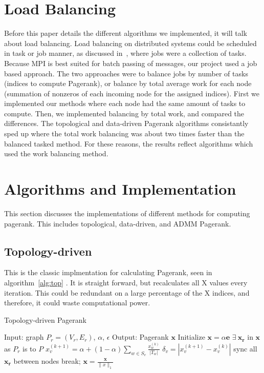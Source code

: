 \documentclass[letterpaper,12pt,onecolumn]{article}
\begin{document}
\section{Load Balancing}
Before this paper details the different algorithms we implemented, it will talk about load balancing. Load balancing on distributed systems could be scheduled in task or job manner, as discussed in~\cite{distributed}, where jobs were a collection of tasks. Because MPI is best suited for batch passing of messages, our project used a job based approach. The two approaches were to balance jobs by number of tasks (indices to compute Pagerank), or balance by total average work for each node (summation of nonzeros of each incoming node for the assigned indices). First we implemented our methods where each node had the same amount of tasks to compute. Then, we implemented balancing by total work, and compared the differences. The topological and data-driven Pagerank algorithms consistantly sped up where the total work balancing was about two times faster than the balanced tasked method. For these reasons, the results reflect algorithms which used the work balancing method. 

\section{Algorithms and Implementation}

This section discusses the implementations of different methods for computing pagerank. This includes topological, data-driven, and ADMM Pagerank. 

\subsection{Topology-driven}
This is the classic implmentation for calculating Pagerank, seen in algorithm~\ref{alg:top} . It is straight forward, but recalculates all X values every iteration. This could be redundant on a large percentage of the X indices, and therefore, it could waste computational power. 

\begin{algorithm}
\caption{Topology-driven Pagerank}
\label{alg:top}
\begin{algorithmic}[1]
  \STATE Input: graph $P_{r} = (V_r, E_r)$, $\alpha$, $\epsilon$
  \STATE Output: Pagerank $\mathbf{x}$
  \STATE Initialize $\mathbf{x} = \alpha \mathbf{e}$
  \STATE $\exists  \medspace \mathbf{x_r}$ in $\mathbf{x}$ as $P_r$ is to $P$
		\STATE $x_{v}^{(k+1)} = \alpha + (1 - \alpha) \sum_{w \in S_v} \frac{x_{w}^{(k)}}{|T_w|} $
		\STATE $\delta_{v} = | x_{v}^{(k+1)} - x_{v}^{(k)} | $
	\ENDFOR
	\STATE sync all $\mathbf{x_r}$ between nodes
	\IF{$\|\delta \|_{\infty} < \epsilon$}
		\STATE break;
	\ENDIF
  \ENDWHILE
  \STATE $\mathbf{x} = \frac{\mathbf{x} }{\|x\|_{1}}$
\end{algorithmic}
\end{algorithm}
\end{document}
